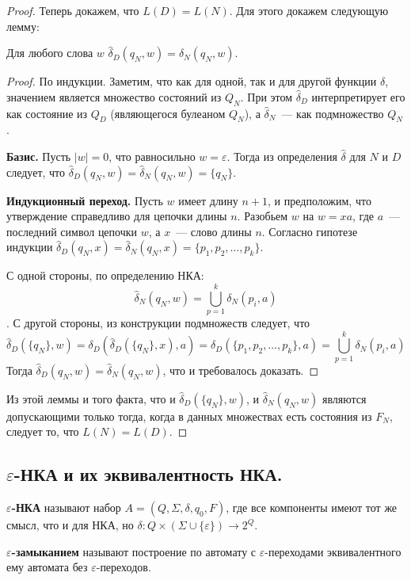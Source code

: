 \documentclass[a4paper,12pt]{article}
\begin{document}
\begin{proof}
		Теперь докажем, что $L(D) = L(N)$. Для этого докажем следующую лемму:
		\begin{lemma}
			Для любого слова $w$ $\hat{\delta}_D({q_N}, w) = \hat{\delta}_N(q_N, w)$.
		\end{lemma}
		\begin{proof}
		 	По индукции. Заметим, что как для одной, так и для другой функции $\delta$, значением является множество состояний из $Q_N$. При этом $\hat{\delta}_D$ интерпретирует его как состояние из $Q_D$ (являющегося булеаном $Q_N$), а $\hat{\delta}_N$~--- как подмножество $Q_N$.
		 	
		 	\textbf{Базис.} Пусть $|w| = 0$, что равносильно $w = \varepsilon$. Тогда из определения $\hat{\delta}$ для $N$ и $D$ следует, что $\hat{\delta}_D({q_N}, w) = \hat{\delta}_N(q_N, w) = \{q_N\}$.
		 	
		 	\textbf{Индукционный переход.} Пусть $w$ имеет длину $n + 1$, и предположим, что утверждение справедливо для цепочки длины $n$. Разобьем $w$ на $w = xa$, где $a$~--- последний символ цепочки $w$, а $x$~--- слово длины $n$. Согласно гипотезе индукции $\hat{\delta}_D({q_N}, x) = \hat{\delta}_N(q_N, x) = \{p_1, p_2, \ldots, p_k\}$.
		 	
		 	С одной стороны, по определению НКА:
		 	\[\hat{\delta}_N(q_N, w) = \bigcup_{p = 1}^{k} \delta_N(p_i, a)\].
		 	С другой стороны, из конструкции подмножеств следует, что
		 	\[\hat{\delta}_D(\{q_N\}, w) = \delta_D(\hat{\delta}_D(\{q_N\}, x), a) = \delta_D(\{p_1, p_2, \ldots, p_k\}, a) = \bigcup_{p = 1}^{k} \delta_N(p_i, a)\]
		 	Тогда $\hat{\delta}_D({q_N}, w) = \hat{\delta}_N(q_N, w)$, что и требовалось доказать.
		\end{proof}
		
		Из этой леммы и того факта, что и $\hat{\delta}_D(\{q_N\}, w)$, и $\hat{\delta}_N(q_N, w)$ являются допускающими только тогда, когда в данных множествах есть состояния из $F_N$, следует то, что $L(N) = L(D)$.
	\end{proof}
	
	\subsection{$\varepsilon$-НКА и их эквивалентность НКА.}
	\textbf{$\varepsilon$-НКА} называют набор $A = (Q, \Sigma,\delta, q_0, F)$, где все компоненты имеют тот же смысл, что и для НКА, но $\delta : Q \times (\Sigma \cup \{\varepsilon\}) \to 2^Q$.
	
	\textbf{$\varepsilon$-замыканием} называют построение по автомату с $\varepsilon$-переходами эквивалентного ему автомата без $\varepsilon$-переходов.
	
\end{document}

